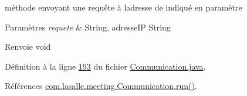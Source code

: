 méthode envoyant une requête à l\textquotesingle{}adresse de indiqué en paramètre 


\begin{DoxyParams}{Paramètres}
{\em requete} & String, adresse\+IP String \\
\hline
\end{DoxyParams}
\begin{DoxyReturn}{Renvoie}
void 
\end{DoxyReturn}


Définition à la ligne \hyperlink{_communication_8java_source_l00193}{193} du fichier \hyperlink{_communication_8java_source}{Communication.\+java}.



Références \hyperlink{_communication_8java_source_l00247}{com.\+lasalle.\+meeting.\+Communication.\+run()}.


